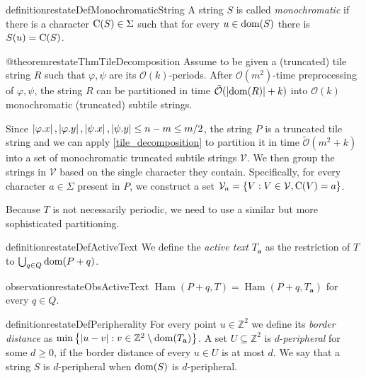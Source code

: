 \documentclass[twoside,leqno]{article}
\let\Cref\cref
\newcommand{\Z}{\mathbb{Z}}
\renewcommand{\O}{\mathcal{O}}
\newcommand{\tO}{\tilde{\mathcal{O}}}
\newcommand{\V}{\mathcal{V}}
\newcommand{\Ta}{T_\mathbf{a}}
\renewcommand{\phi}{\varphi}
\newcommand{\set}[1]{\left\lbrace #1 \right\rbrace}
\DeclareMathOperator*{\Ham}{Ham}
\newcommand{\absolute}[1]{\left\lvert#1\right\rvert}
\begin{document}
\begin{restatable*}{definition}{restateDefMonochromaticString}
A string $S$ is called \emph{monochromatic} if there is a character $\operatorname*{C}(S) \in \Sigma$ such that for every $u \in \operatorname*{dom}(S)$ there is $S(u) = \operatorname*{C}(S)$.  
\end{restatable*}

\begin{restatable*}{@theorem}{restateThmTileDecomposition}\label{tile_decomposition}
Assume to be given a (truncated) tile string $R$ such that $\phi, \psi$ are its $\O(k)$-periods. After $\O(m^2)$-time preprocessing of $\phi, \psi$, the string $R$ can be partitioned in time $\tO(\absolute{\d{R}} + k)$ into $\O(k)$ monochromatic (truncated) subtile strings.
\end{restatable*}

Since $\absolute{\x{\phi}}, \absolute{\y{\phi}}, \absolute{\x{\psi}}, \absolute{\y{\psi}} \le n - m \le m / 2$, the string $P$ is a truncated tile string and we can apply \Cref{tile_decomposition} to partition it in time $\tO(m^2 + k)$ into a set of monochromatic truncated subtile strings $\V$. We then group the strings in $\V$ based on the single character they contain. Specifically, for every character $a \in \Sigma$ present in $P$, we construct a set $\V_a = \set{V : V \in \V, \getchar{V} = a}$.

Because $T$ is not necessarily periodic, we need to use a similar but more sophisticated partitioning.

\begin{restatable*}{definition}{restateDefActiveText}
We define the \emph{active text} $\Ta$ as the restriction of $T$ to $\bigcup_{q \in Q} \operatorname*{dom}(P + q)$. 
\end{restatable*}

\begin{restatable*}{observation}{restateObsActiveText}\label{obs:active_text}
$\Ham(P + q, T) = \Ham(P + q, \Ta)$ for every $q \in Q$.
\end{restatable*}

\begin{restatable*}[Peripherality]{definition}{restateDefPeripherality}
For every point $u \in \Z^2$ we define its \emph{border distance} as $\min\set{\absolute{u - v} : v \in \Z^2 \setminus \d{\Ta}}$. A set $U \subseteq \Z^2$ is $d$-\emph{peripheral} for some $d \ge 0$, if the border distance of every $u \in U$ is at most $d$. We say that a string $S$ is $d$-peripheral when $\operatorname*{dom}(S)$ is $d$-peripheral.
\end{restatable*}
\end{document}
